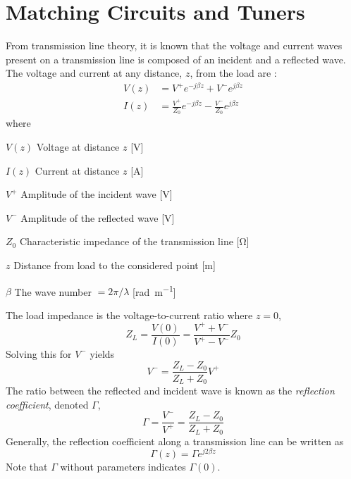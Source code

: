 \section{Matching Circuits and Tuners}
\label{sec:tuners}


From transmission line theory, it is known that the voltage and current waves present on a transmission line is composed of an incident and a reflected wave. The voltage and current at any distance, $z$, from the load are \cite{pozar2011microwave}:
\begin{align}
    V(z) &= V^+e^{-j\beta z} + V^-e^{j\beta z}\\
    I(z) &= \frac{V^+}{Z_0} e^{-j\beta z} - \frac{V^-}{Z_0} e^{j\beta z}
\end{align}
where
\begin{where}
\item[$V(z)$] Voltage at distance $z$ [\si{V}]
\item[$I(z)$] Current at distance $z$ [\si{A}]
\item[$V^+$] Amplitude of the incident wave [\si{V}]
\item[$V^-$] Amplitude of the reflected wave [\si{V}]
\item[$Z_0$] Characteristic impedance of the transmission line [\si{\ohm}]
\item[$z$] Distance from load to the considered point [\si{m}]
\item[$\beta$] The wave number $=2\pi/\lambda$ [\si{rad\per m}]
\end{where}
The load impedance is the voltage-to-current ratio where $z=0$,
\begin{equation}
    Z_L = \frac{V(0)}{I(0)} = \frac{V^+ + V^-}{V^+ - V^-}Z_0
\end{equation}
Solving this for $V^-$ yields
\begin{equation}
    V^- = \frac{Z_L - Z_0}{Z_L + Z_0} V^+
\end{equation}
The ratio between the reflected and incident wave is known as the \emph{reflection coefficient}, denoted $\Gamma$,
\begin{equation}
    \label{eq:reflect}
    \Gamma = \frac{V^-}{V^+} = \frac{Z_L-Z_0}{Z_L+Z_0}
\end{equation}
Generally, the reflection coefficient along a transmission line can be written as \cite{ebert1998transmission}
\begin{equation}
    \Gamma(z) = \Gamma e^{j2\beta z}
\end{equation}
Note that $\Gamma$ without parameters indicates $\Gamma(0)$.

